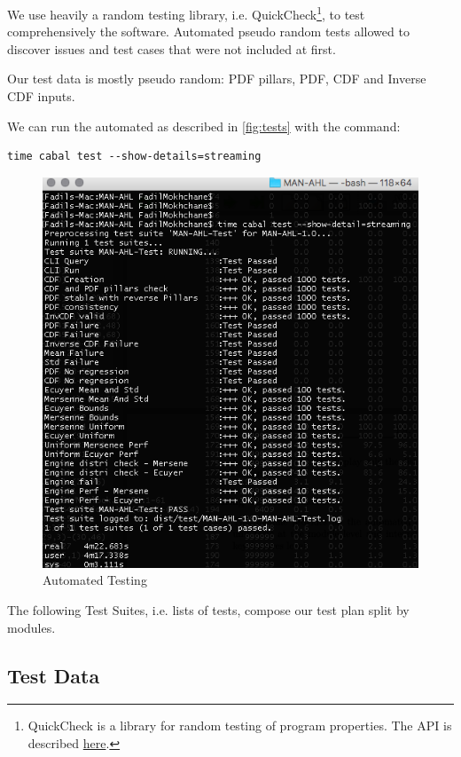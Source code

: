 \documentclass[12pt,a4paper,article]{memoir} %
\begin{document}
We use heavily a random testing library, i.e. QuickCheck\footnote{
QuickCheck is a library for random testing of program properties.
The API is described 
\href{http://hackage.haskell.org/package/QuickCheck-2.10.0.1/docs/Test-QuickCheck.html}{here}.
}, to test comprehensively the software.
Automated pseudo random tests allowed to discover issues and
test cases that were not included at first.

Our test data is mostly pseudo random: 
PDF pillars, PDF, CDF and Inverse CDF inputs.

We can run the automated as described in  \autoref{fig:tests} with the command:
\begin{verbatim}
time cabal test --show-details=streaming
\end{verbatim}
\begin{figure}[h!]
\begin{center}
\includegraphics[width=1\textwidth]{img/tests.png}
\caption{Automated Testing}
\label{fig:tests}
\end{center}
\end{figure}

The following Test Suites, i.e. lists of tests, compose our test plan split by modules.

\subsection{Test Data}
\end{document}
